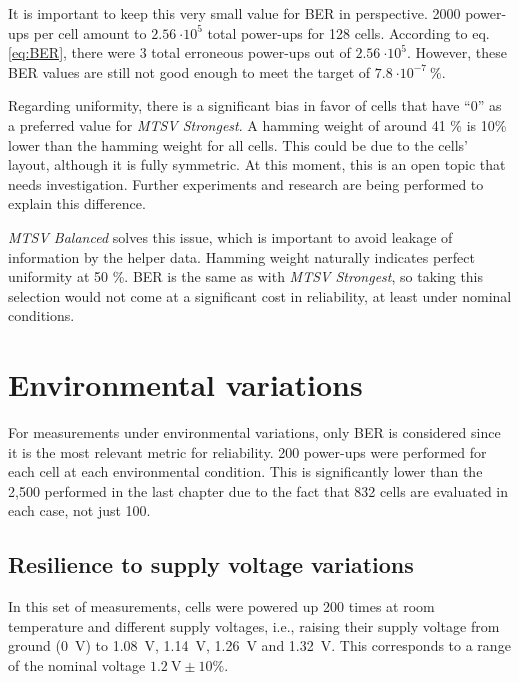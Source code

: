 It is important to keep this very small value for BER in perspective. 2000 power-ups per cell amount to $\SI{2.56}{\cdot 10^5}$ total power-ups for 128 cells. According to eq. \ref{eq:BER}, there were 3 total erroneous power-ups out of  $\SI{2.56}{\cdot 10^5}$. However, these BER values are still not good enough to meet the target of $\SI{7.8}{\cdot 10^{-7}\ \%}$.

Regarding uniformity, there is a significant bias in favor of cells that have ``0'' as a preferred value for \textit{MTSV Strongest}. A hamming weight of around 41 \% is 10\% lower than the hamming weight for all cells. This could be due to the cells' layout, although it is fully symmetric. At this moment, this is an open topic that needs investigation. Further experiments and research are being performed to explain this difference. 

\textit{MTSV Balanced} solves this issue, which is important to avoid leakage of information by the helper data. Hamming weight naturally indicates perfect uniformity at 50 \%. BER is the same as with \textit{MTSV Strongest}, so taking this selection would not come at a significant cost in reliability, at least under nominal conditions. 


\section{Environmental variations}

For measurements under environmental variations, only BER is considered since it is the most relevant metric for reliability.  200 power-ups were performed for each cell at each environmental condition. This is significantly lower than the 2,500 performed in the last chapter due to the fact that 832 cells are evaluated in each case, not just 100. 

\subsection{Resilience to supply voltage variations}

In this set of measurements, cells were powered up 200 times at room temperature and different supply voltages, i.e., raising their supply voltage from ground (\SI{0}{V}) to \SI{1.08}{V}, \SI{1.14}{V}, \SI{1.26}{V} and \SI{1.32}{V}. This corresponds to a range of the nominal voltage $1.2 \ \mathrm{V} \pm 10\%$. 

